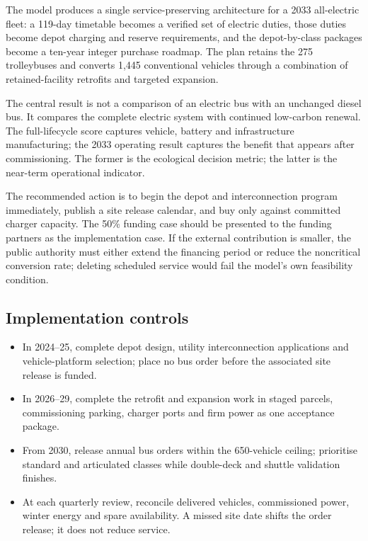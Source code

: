 \documentclass[12pt,letterpaper]{article}
\begin{document}
The model produces a single service-preserving architecture for a 2033 all-electric fleet: a 119-day timetable becomes a verified set of electric duties, those duties become depot charging and reserve requirements, and the depot-by-class packages become a ten-year integer purchase roadmap. The plan retains the 275 trolleybuses and converts 1,445 conventional vehicles through a combination of retained-facility retrofits and targeted expansion.

The central result is not a comparison of an electric bus with an unchanged diesel bus. It compares the complete electric system with continued low-carbon renewal. The full-lifecycle score captures vehicle, battery and infrastructure manufacturing; the 2033 operating result captures the benefit that appears after commissioning. The former is the ecological decision metric; the latter is the near-term operational indicator.

The recommended action is to begin the depot and interconnection program immediately, publish a site release calendar, and buy only against committed charger capacity. The 50\% funding case should be presented to the funding partners as the implementation case. If the external contribution is smaller, the public authority must either extend the financing period or reduce the noncritical conversion rate; deleting scheduled service would fail the model's own feasibility condition.

\subsection*{Implementation controls}
\begin{itemize}
\item In 2024--25, complete depot design, utility interconnection applications and vehicle-platform selection; place no bus order before the associated site release is funded.
\item In 2026--29, complete the retrofit and expansion work in staged parcels, commissioning parking, charger ports and firm power as one acceptance package.
\item From 2030, release annual bus orders within the 650-vehicle ceiling; prioritise standard and articulated classes while double-deck and shuttle validation finishes.
\item At each quarterly review, reconcile delivered vehicles, commissioned power, winter energy and spare availability. A missed site date shifts the order release; it does not reduce service.
\end{itemize}
\end{document}
